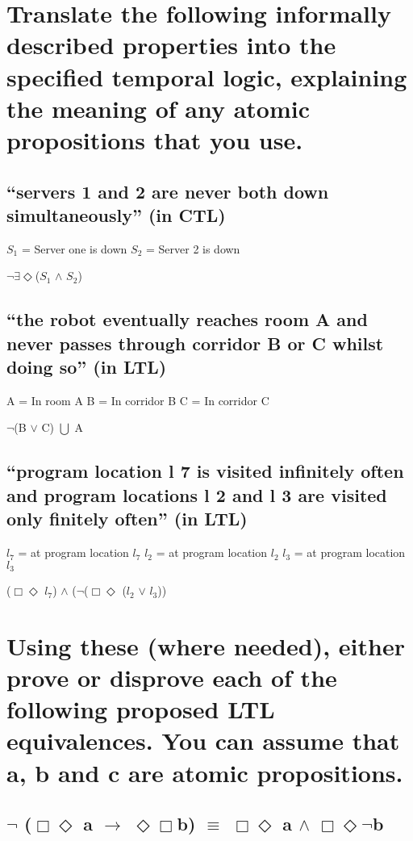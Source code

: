 \documentclass{article}
\begin{document}
\section{Translate the following informally described properties into the specified temporal logic, explaining the meaning of any atomic propositions that you use.}

\subsection{“servers 1 and 2 are never both down simultaneously” (in CTL)}

$S_1$ = Server one is down
\smallbreak
$S_2$ = Server 2 is down
\smallbreak

$\neg$$\exists$$\Diamond$($S_1$ $\land$ $S_2$)

\subsection{“the robot eventually reaches room A and never passes through corridor B or C whilst
doing so” (in LTL)}

A = In room A
\smallbreak
B = In corridor B
\smallbreak
C = In corridor C
\smallbreak

$\neg$(B $\lor$ C) $\bigcup$ A

\subsection{“program location l 7 is visited infinitely often and program locations l 2 and l 3 are visited
only finitely often” (in LTL)}

$l_7$ = at program location $l_7$
\smallbreak
$l_2$ = at program location $l_2$
\smallbreak
$l_3$ = at program location $l_3$
\smallbreak

($\Box$$\Diamond$ $l_7$) $\land$ ($\neg$($\Box$$\Diamond$ ($l_2$ $\lor$ $l_3$))

\section{Using these (where needed), either prove or disprove each of the following proposed LTL equivalences. You can assume that a, b and c are atomic propositions.}

\subsection{$\neg$ ($\Box$$\Diamond$ a $\rightarrow$ $\Diamond$$\Box$b) $\equiv$  $\Box$$\Diamond$ a $\land$ $\Box$$\Diamond$$\neg$b }
\end{document}

